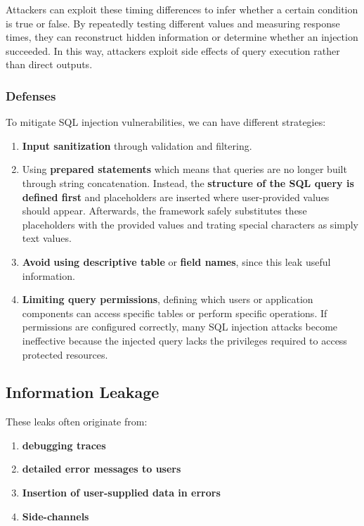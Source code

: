 \documentclass{article}
\begin{document}
Attackers can exploit these timing differences to infer whether a certain condition is true or false. By repeatedly testing different values and measuring response times, they can reconstruct hidden information or determine whether an injection succeeded. In this way, attackers exploit side effects of query execution rather than direct outputs.

\subsubsection{Defenses}

To mitigate SQL injection vulnerabilities, we can have different strategies:

\begin{enumerate}
    \item \textbf{Input sanitization} through validation and filtering.
    \item Using \textbf{prepared statements} which means that queries are no longer built through string concatenation. Instead, the \textbf{structure of the SQL query is defined first} and placeholders are inserted where user-provided values should appear. Afterwards, the framework safely substitutes these placeholders with the provided values and trating special characters as simply text values.
    \item \textbf{Avoid} \textbf{using descriptive table} or \textbf{field names}, since this leak useful information.
    \item \textbf{Limiting query permissions}, defining which users or application components can access specific tables or perform specific operations. If permissions are configured correctly, many SQL injection attacks become ineffective because the injected query lacks the privileges required to access protected resources.
\end{enumerate}

\subsection{Information Leakage}

These leaks often originate from:

\begin{enumerate}
    \item \textbf{debugging traces}
    \item \textbf{detailed error messages to users}
    \item \textbf{Insertion of user-supplied data in errors}
    \item \textbf{Side-channels}
\end{enumerate}
\end{document}
